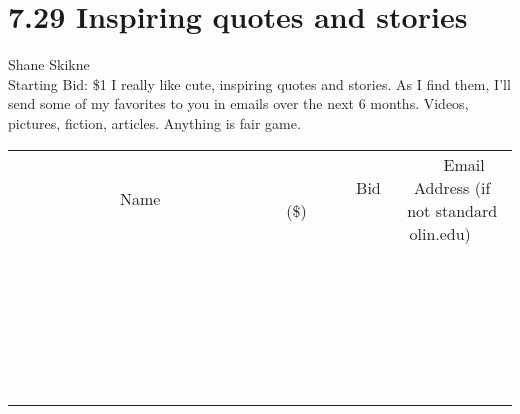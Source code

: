 \documentclass[11pt]{article}
\begin{document}
\section*{7.29 Inspiring quotes and stories}
Shane Skikne
\\
Starting Bid: \$1
\newline
I really like cute, inspiring quotes and stories. As I find them, I'll send some of my favorites to you in emails over the next 6 months. Videos, pictures, fiction, articles. Anything is fair game.
\\[6ex]
\begin{tabular}{c c c}
~~~~~~~~~~~~~Name~~~~~~~~~~~~~ & ~~~~~~~~~Bid (\$)~~~~~~~~~  & ~~~Email Address (if not standard olin.edu)~~~\\
 & & \\
\hline
 & & \\
\hline
 & & \\
\hline
 & & \\
\hline
 & & \\
\hline
 & & \\
\hline
 & & \\
\hline
 & & \\
\hline
 & & \\
\hline
 & & \\
\hline
 & & \\
\hline
 & & \\
\hline
 & & \\
\hline
 & & \\
\hline
 & & \\
\hline
 & & \\
\hline
 & & \\
\hline
 & & \\
\hline
 & & \\
\hline
 & & \\
\hline
 & & \\
\hline
 & & \\
\hline
 & & \\
\hline
 & & \\
\hline
 & & \\
\hline
 & & \\
\hline
\end{tabular}
\newpage
\end{document}
